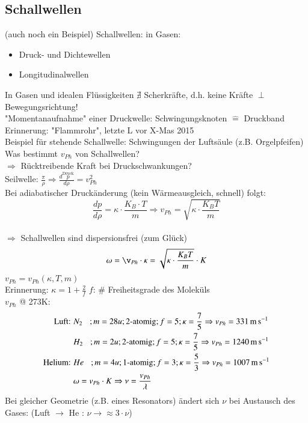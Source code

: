 \subsection{Schallwellen} (auch noch ein Beispiel)
Schallwellen: in Gasen:
\begin{itemize}
	\item Druck- und Dichtewellen
	\item Longitudinalwellen
\end{itemize}
In Gasen und idealen Flüssigkeiten $ \nexists $ Scherkräfte, d.h. keine Kräfte $ \perp $ Bewegungsrichtung!\\
"Momentanaufnahme" einer Druckwelle:
\bild
Schwingungsknoten $ \hat{=} $ Druckband\\
Erinnerung: "Flammrohr", letzte L vor X-Mas 2015\\
Beispiel für stehende Schallwelle: Schwingungen der Luftsäule (z.B. Orgelpfeifen)
\bild
Was bestimmt $ v_{Ph} $ von Schallwellen?\\
$ \Rightarrow $ Rücktreibende Kraft bei Druckschwankungen?\\
Seilwelle: $ \frac{\pi}{\rho} \Rightarrow \frac{d\overset{\text{Druck}}{p}}{d\rho}=v^2_{Ph}$\\
Bei adiabatischer Druckänderung  (kein Wärmeausgleich, schnell) folgt:\\
$$ \frac{dp}{d\rho} = \kappa \cdot \frac{K_B \cdot T}{m} \Rightarrow \boxed{v_{Ph} = \sqrt{\kappa\cdot\frac{K_BT}{m}}}$$\\
$ \Rightarrow $ Schallwellen sind dispersionsfrei (zum Glück)
$$ \omega = \v_{Ph} \cdot \kappa = \sqrt{\kappa\cdot\frac{K_BT}{m}} \cdot K $$
$ v_{Ph} = v_{Ph}(\kappa,T,m) $\\
Erinnerung: $ \kappa = 1 + \frac{2}{f} $ \hspace{5mm} $ f $: $ \# $ Freiheitsgrade des Moleküls\\
\enter
$ v_{Ph} $ @ 273K:\\
\begin{align*}
\text{Luft: } &N_2 \hspace{3mm}; m=28u; 2\text{-atomig}; f=5; \kappa = \frac{7}{5} \Rightarrow v_{Ph}=\SI{331}{\meter\per\second}\\
&H_2 \hspace{3mm}; m=2u; 2\text{-atomig}; f=5; \kappa = \frac{7}{5} \Rightarrow v_{Ph}=\SI{1240}{\meter\per\second} \\
\text{Helium: } &He \hspace{3mm}; m=4u; 1\text{-atomig}; f=3; \kappa = \frac{5}{3} \Rightarrow v_{Ph}=\SI{1007}{\meter\per\second}\\
&\omega= v_{Ph} \cdot K \Rightarrow \nu = \frac{v_{Ph}}{\lambda}
\end{align*}
Bei gleicher Geometrie (z.B. eines Resonators) ändert sich $ \nu $ bei Austausch des Gases: (Luft $ \rightarrow $ He : $ \nu \rightarrow \approx 3 \cdot \nu$)\\
